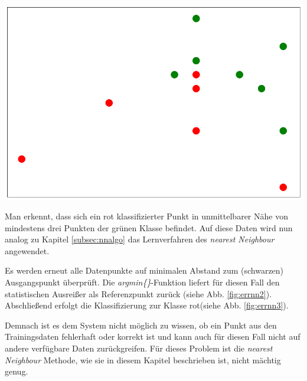 \documentclass[fontsize=11pt]{scrartcl}
\newenvironment{Figure}
  {\par\medskip\noindent\minipage{\linewidth}}
  {\endminipage\par\medskip}
\begin{document}
                \begin{Figure}
                    \centering
                    \includegraphics[scale=0.2]{errnn3.png}
                    \label{fig:errnn3}  
                \end{Figure}
                
                  Man erkennt, dass sich ein rot klassifizierter Punkt in unmittelbarer Nähe von mindestens drei Punkten der grünen Klasse befindet. %
                   Auf diese Daten wird nun analog zu Kapitel \ref{subsec:nnalgo} das Lernverfahren des \emph{nearest Neighbour} angewendet.\par
                
                Es werden erneut alle Datenpunkte auf minimalen Abstand zum (schwarzen) Ausgangspunkt überprüft. Die \emph{argmin\{\}}-Funktion liefert für diesen Fall den statistischen Ausreißer als Referenzpunkt zurück (siehe Abb. \ref{fig:errnn2}). Abschließend erfolgt die Klassifizierung zur Klasse rot(siehe Abb. \ref{fig:errnn3}).\par
                Demnach ist es dem System nicht möglich zu wissen, ob ein Punkt aus den Trainingsdaten fehlerhaft oder korrekt ist und kann auch für diesen Fall nicht auf andere verfügbare Daten zurückgreifen. Für dieses Problem ist die \emph{nearest Neighbour} Methode, wie sie in diesem Kapitel beschrieben ist, nicht mächtig genug.
                         
\end{document}
